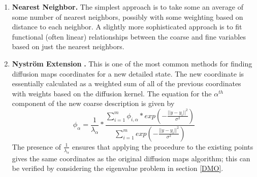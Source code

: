 \documentclass[12pt]{article}
\begin{document}
\begin{enumerate}
\item \textbf{Nearest Neighbor.} The simplest approach is to take some an average of some number of nearest neighbors, possibly with some weighting based on distance to each neighbor. A slightly more sophisticated approach is to fit functional (often linear) relationships between the coarse and fine variables based on just the nearest neighbors.
\item \textbf{Nystr\"om Extension }\cite{Fowlkes2004}\textbf{.}   This is one of the most common methods for finding diffusion maps coordinates for a new detailed state. The new coordinate is essentially calculated as a weighted sum of all of the previous coordinates with weights based on the diffusion kernel. The equation for the $\alpha^{th}$ component of the new coarse description is given by
\[
\phi_{\alpha} = \frac{1}{\lambda_\alpha}*\frac{\sum_{i=1}^m \phi_{i,\alpha}*exp(-\frac{||y-y_i||^2}{\sigma ^2})}{\sum_{i=1}^m exp(-\frac{||y-y_i||^2}{\sigma ^2})}
\]
The presence of $\frac{1}{\lambda_\alpha}$ ensures that applying the procedure to the existing points gives the same coordinates as the original diffusion maps algorithm; this can be verified by considering the eigenvalue problem in section \ref{DMO}. \vspace{1mm}


\end{enumerate}
\end{document}
